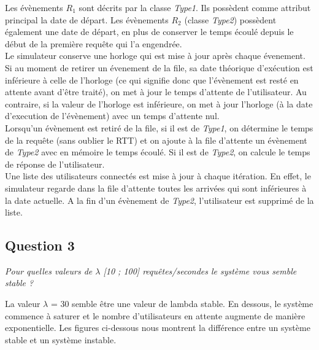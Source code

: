 \documentclass[12pt]{article}
\begin{document}
Les évènements $R_{1}$ sont décrits par la classe \textit{Type1}. Ils possèdent comme attribut principal la date de départ. Les évènements $R_{2}$ (classe \textit{Type2}) possèdent également une date de départ, en plus de conserver le temps écoulé depuis le début de la première requête qui l'a engendrée.\\

Le simulateur conserve une horloge qui est mise à jour après chaque évenement. Si au moment de retirer un évenement de la file, sa date théorique d'exécution est inférieure à celle de l'horloge (ce qui signifie donc que l'évènement est resté en attente avant d'être traité), on met à jour le temps d'attente de l'utilisateur. Au contraire, si la valeur de l'horloge est inférieure, on met à jour l'horloge (à la date d'execution de l'évènement) avec un temps d'attente nul.\\

Lorsqu'un évènement est retiré de la file, si il est de \textit{Type1}, on détermine le temps de la requête (sans oublier le RTT) et on ajoute à la file d'attente un évènement de \textit{Type2} avec en mémoire le temps écoulé. Si il est de \textit{Type2}, on calcule le temps de réponse de l'utilisateur.\\

Une liste des utilisateurs connectés est mise à jour à chaque itération. En effet, le simulateur regarde dans la file d'attente toutes les arrivées qui sont inférieures à la date actuelle. A la fin d'un évènement de \textit{Type2}, l'utilisateur est supprimé de la liste.\\

\subsection{Question 3}
\textit{Pour quelles valeurs de $\lambda$ [10 ; 100] requêtes/secondes le système vous semble stable ? \\} 

La valeur $\lambda$ = 30 semble être une valeur de lambda stable. En dessous, le système commence à saturer et le nombre d'utilisateurs en attente augmente de manière exponentielle. Les figures ci-dessous nous montrent la différence entre un système stable et un système instable.\\
\end{document}
